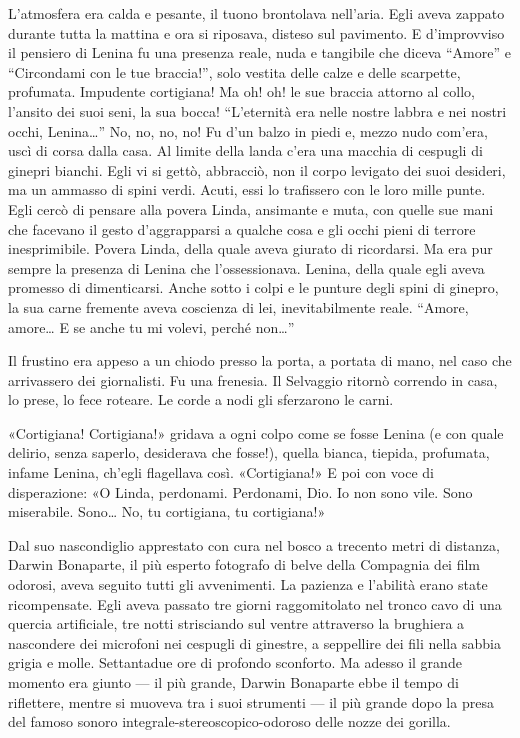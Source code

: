 \documentclass[
a5paper, %
10pt, %
twoside, 
onecolumn, %
openany, %
]{memoir}
\begin{document}
L’atmosfera era calda e pesante, il tuono brontolava nell’aria. Egli aveva zappato durante tutta la mattina e ora si riposava, disteso sul pavimento. E d’improvviso il pensiero di Lenina fu una presenza reale, nuda e tangibile che diceva “Amore” e “Circondami con le tue braccia!”, solo vestita delle calze e delle scarpette, profumata. Impudente cortigiana! Ma oh! oh! le sue braccia attorno al collo, l’ansito dei suoi seni, la sua bocca! “L’eternità era nelle nostre labbra e nei nostri occhi, Lenina…” No, no, no, no! Fu d’un balzo in piedi e, mezzo nudo com’era, uscì di corsa dalla casa. Al limite della landa c’era una macchia di cespugli di ginepri bianchi. Egli vi si gettò, abbracciò, non il corpo levigato dei suoi desideri, ma un ammasso di spini verdi. Acuti, essi lo trafissero con le loro mille punte. Egli cercò di pensare alla povera Linda, ansimante e muta, con quelle sue mani che facevano il gesto d’aggrapparsi a qualche cosa e gli occhi pieni di terrore inesprimibile. Povera Linda, della quale aveva giurato di ricordarsi. Ma era pur sempre la presenza di Lenina che l’ossessionava. Lenina, della quale egli aveva promesso di dimenticarsi. Anche sotto i colpi e le punture degli spini di ginepro, la sua carne fremente aveva coscienza di lei, inevitabilmente reale. “Amore, amore… E se anche tu mi volevi, perché non…”

Il frustino era appeso a un chiodo presso la porta, a portata di mano, nel caso che arrivassero dei giornalisti. Fu una frenesia. Il Selvaggio ritornò correndo in casa, lo prese, lo fece roteare. Le corde a nodi gli sferzarono le carni.

«Cortigiana! Cortigiana!» gridava a ogni colpo come se fosse Lenina (e con quale delirio, senza saperlo, desiderava che fosse!), quella bianca, tiepida, profumata, infame Lenina, ch’egli flagellava così. «Cortigiana!» E poi con voce di disperazione: «O Linda, perdonami. Perdonami, Dio. Io non sono vile. Sono miserabile. Sono… No, tu cortigiana, tu cortigiana!»

Dal suo nascondiglio apprestato con cura nel bosco a trecento metri di distanza, Darwin Bonaparte, il più esperto fotografo di belve della Compagnia dei film odorosi, aveva seguito tutti gli avvenimenti. La pazienza e l’abilità erano state ricompensate. Egli aveva passato tre giorni raggomitolato nel tronco cavo di una quercia artificiale, tre notti strisciando sul ventre attraverso la brughiera a nascondere dei microfoni nei cespugli di ginestre, a seppellire dei fili nella sabbia grigia e molle. Settantadue ore di profondo sconforto. Ma adesso il grande momento era giunto — il più grande, Darwin Bonaparte ebbe il tempo di riflettere, mentre si muoveva tra i suoi strumenti — il più grande dopo la presa del famoso sonoro integrale-stereoscopico-odoroso delle nozze dei gorilla.
\end{document}
